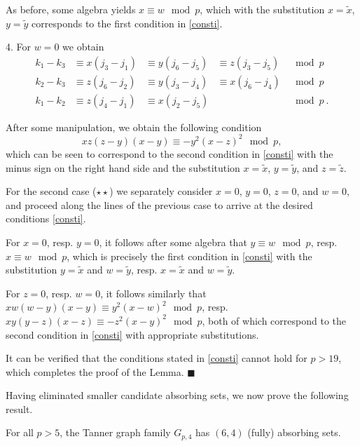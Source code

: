 As before, some algebra yields $x\equiv w \mod p$, which with the
substitution $x=\tilde{x}$, $y=\tilde{y}$ corresponds to the first
condition in \eqref{consti}.

 4. For $w=0$ we obtain
\begin{equation}\begin{array}{ccccc} k_1-k_3
&\equiv x(j_3-j_1)& \equiv y(j_6-j_5)& \equiv z(j_3-j_5) &\mod p
\\
k_2-k_3 &\equiv z(j_6-j_2) &\equiv  y(j_3-j_4) &\equiv x(j_6-j_4)
&\mod
p\\
k_1-k_2 &\equiv z(j_4-j_1) &\equiv x(j_2-j_5) & {}&\mod p~.
\end{array}\end{equation}

After some manipulation, we obtain the following condition
\begin{equation}
xz(z-y)(x-y) \equiv -y^2(x-z)^2 \mod p,
\end{equation}
which can be seen to correspond to the second condition in
\eqref{consti} with the minus sign on the right hand side and the
substitution $x=\tilde{x}$, $y=\tilde{y}$, and $z=\tilde{z}$.

For the second case ($\star \star $) we separately consider $x=0$,
$y=0$, $z=0$, and $w=0$, and proceed along the lines of the previous
case to arrive at the desired conditions \eqref{consti}.

For $x=0$, resp. $y=0$, it follows after some algebra that $y \equiv
w \mod p$, resp. $x \equiv w \mod p$, which is precisely the first
condition in \eqref{consti} with the substitution $y=\tilde{x}$ and
$w=\tilde{y}$, resp. $x=\tilde{x}$ and $w=\tilde{y}$.


For $z=0$, resp. $w=0$, it follows similarly that $xw(w-y)(x-y)
\equiv y^2(x-w)^2 \mod p$, resp. $xy(y-z)(x-z) \equiv -z^2(x-y)^2
\mod p$, both of which correspond to the second condition in
\eqref{consti} with appropriate substitutions.


It can be verified that the conditions stated in \eqref{consti}
cannot hold for $p>19$, which completes the proof of the Lemma.
\hfill$\blacksquare$

Having eliminated smaller candidate absorbing sets, we now prove the
following result.

\begin{lemma}\label{Lem5} For all $p > 5$, the Tanner graph family $G_{p,4}$ has $(6,4)$ (fully) absorbing
sets.
\end{lemma}

